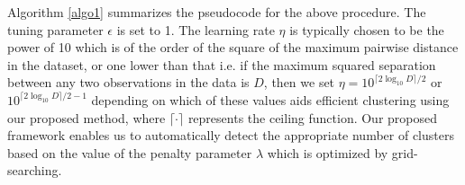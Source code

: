 \documentclass[12pt]{article}
\begin{document}
Algorithm \ref{algo1} summarizes the pseudocode for the above procedure. The tuning parameter $\epsilon$ is set to 1. The learning rate $\eta$ is typically chosen to be the power of 10 which is of the order of the square of the maximum pairwise distance in the dataset, or one lower than that i.e. if the maximum squared separation between any two observations in the data is $D$, then we set $\eta = 10 ^{\lceil 2\log_{10} D \rceil /2}$ or $10^{\lceil 2\log_{10} D \rceil /2-1}$ depending on which of these values aids efficient clustering using our proposed method, where $\lceil \cdot \rceil$ represents the ceiling function. Our proposed framework enables us to automatically detect the appropriate number of clusters based on the value of the penalty parameter $\lambda$ which is optimized by grid-searching.

\end{document}
